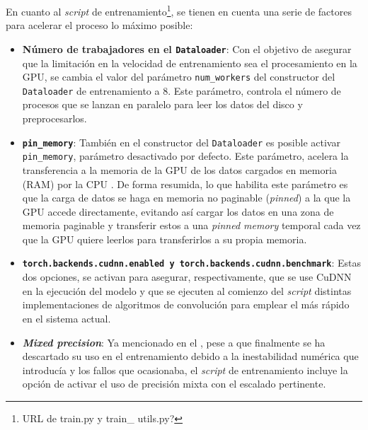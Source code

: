 En cuanto al \textit{script} de entrenamiento\footnote{URL de train.py y train\_ utils.py?}, se tienen en cuenta una serie de factores para acelerar el proceso lo máximo posible:
\begin{itemize}

\item \textbf{Número de trabajadores en el \texttt{Dataloader}}: Con el objetivo de asegurar que la limitación en la velocidad de entrenamiento sea el procesamiento en la GPU, se cambia el valor del parámetro \texttt{num\_workers} del constructor del \texttt{Dataloader} de entrenamiento a 8. Este parámetro, controla el número de procesos que se lanzan en paralelo para leer los datos del disco y preprocesarlos.

\item \textbf{\texttt{pin\_memory}}: También en el constructor del \texttt{Dataloader} es posible activar \texttt{pin\_memory}, parámetro desactivado por defecto. Este parámetro, acelera la transferencia a la memoria de la GPU de los datos cargados en memoria (RAM) por la CPU \cite{harris2012}. De forma resumida, lo que habilita este parámetro es que la carga de datos se haga en memoria no paginable (\textit{pinned}) a la que la GPU accede directamente, evitando así cargar los datos en una zona de memoria paginable y transferir estos a una \textit{pinned memory} temporal cada vez que la GPU quiere leerlos para transferirlos a su propia memoria.

\item \textbf{\texttt{torch.backends.cudnn.enabled y \texttt{torch.backends.cudnn.benchmark}}}: Estas dos opciones, se activan para asegurar, respectivamente, que se use CuDNN en la ejecución del modelo y que se ejecuten al comienzo del \textit{script} distintas implementaciones de algoritmos de convolución para emplear el más rápido en el sistema actual.

\item \textbf{\textit{Mixed precision}}: Ya mencionado en el , pese a que finalmente se ha descartado su uso en el entrenamiento debido a la inestabilidad numérica que introducía y los fallos que ocasionaba, el \textit{script} de entrenamiento incluye la opción de activar el uso de precisión mixta con el escalado pertinente.
\end{itemize}

